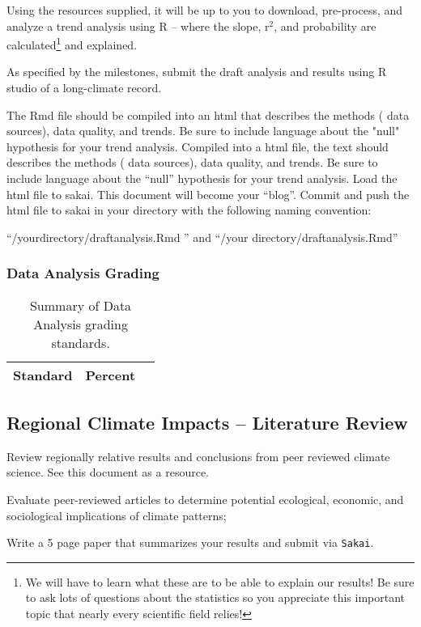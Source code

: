 \documentclass{article}\usepackage[]{graphicx}\usepackage[]{color}
\begin{document}
Using the resources supplied, it will be up to you to download, pre-process, and analyze a trend analysis using R -- where the slope, r$^2$, and probability are calculated\footnote{We will have to learn what these are to be able to explain our results! Be sure to ask lots of questions about the statistics so you appreciate this important topic that nearly every scientific field relies!} and explained. 

As specified by the milestones, submit the draft analysis and results using R studio of a long-climate record. 


The Rmd file should be compiled into an html that describes the methods ( data sources), data quality, and trends. Be sure to include language about the "null" hypothesis for your trend analysis. Compiled into a html file, the text should describes the methods ( data sources), data quality, and trends. Be sure to include language about the ``null'' hypothesis for your trend analysis. Load the html file to sakai. This document will become your ``blog''. Commit and push the html file to sakai in your directory with the following naming convention:

``/yourdirectory/draftanalysis.Rmd '' and ``/your directory/draftanalysis.Rmd''

\subsubsection{Data Analysis Grading}

\begin{table}[h]
\caption{Summary of Data Analysis grading standards.}
\label{tab:datagrading}
\begin{tabular}{lll}\hline
Standard      &   Percent   & \\ \hline\hline
\hline
\end{tabular}
\end{table}


\subsection{Regional Climate Impacts -- Literature Review}

Review regionally relative results and conclusions from peer reviewed climate science. See this document as a resource.

Evaluate peer-reviewed articles to determine potential ecological, economic, and sociological implications of climate patterns;

Write a 5 page paper that summarizes your results and submit via \texttt{Sakai}.
\end{document}
